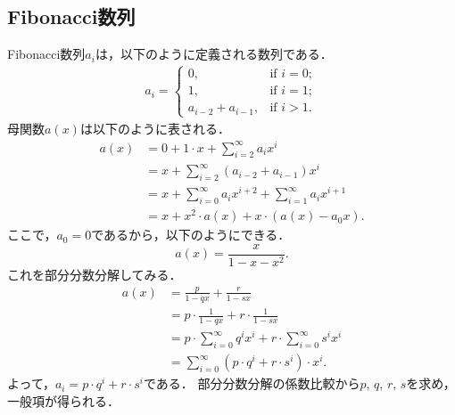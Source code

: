 \documentclass{jsarticle}
\begin{document}
\subsection{Fibonacci数列}
Fibonacci数列$a_i$は，以下のように定義される数列である．
\begin{align*}
  a_i = \begin{cases}
    0, & \text{if }i = 0;\\
    1, & \text{if }i = 1;\\
    a_{i-2} + a_{i-1}, & \text{if }i > 1.
  \end{cases}
\end{align*}
母関数$a(x)$は以下のように表される．
\begin{align*}
  a(x) &= 0 + 1\cdot x + \sum_{i=2}^\infty a_i x^i\\
  &= x + \sum_{i=2}^\infty (a_{i-2} + a_{i-1}) x^i\\
  &= x + \sum_{i=0}^\infty a_i x^{i+2} + \sum_{i=1}^\infty a_i x^{i+1}\\
  &= x + x^2\cdot a(x) + x\cdot (a(x)-a_0x).
\end{align*}
ここで，$a_0 = 0$であるから，以下のようにできる．
\[
a(x) = \frac{x}{1-x-x^2}.
\]
これを部分分数分解してみる．
\begin{align*}
  a(x) &= \frac{p}{1-qx} + \frac{r}{1-sx}\\
  &= p\cdot\frac{1}{1-qx}+r\cdot\frac{1}{1-sx}\\
  &= p\cdot\sum_{i=0}^\infty q^ix^i + r\cdot\sum_{i=0}^\infty s^ix^i\\
  &= \sum_{i=0}^\infty (p\cdot q^i + r\cdot s^i)\cdot x^i.
\end{align*}
よって，$a_i = p\cdot q^i+r\cdot s^i$である．
部分分数分解の係数比較から$p$, $q$, $r$, $s$を求め，一般項が得られる．
\end{document}
